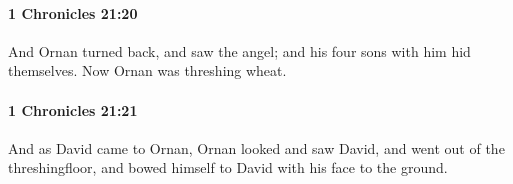 		\paragraph{1 Chronicles 21:20} %
			\label{1CHRONICLES-21-20}

			And Ornan turned back, and saw the angel; and his four sons with him hid themselves. Now Ornan was threshing wheat.


		\paragraph{1 Chronicles 21:21} %
			\label{1CHRONICLES-21-21}

			And as David came to Ornan, Ornan looked and saw David, and went out of the threshingfloor, and bowed himself to David with his face to the ground.



